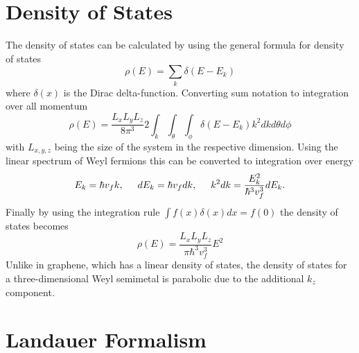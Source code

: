\documentclass[prb,twocolumn,aps,superscriptaddress,showpacs,floatfix]{revtex4}
\begin{document}

\section{Density of States}
			The density of states can be calculated by using the general formula for density of states \cite{bb3}
			\begin{equation}
				\rho\left(E\right)=\sum_{k}\delta\left(E-E_{k}\right)
			\end{equation}
			where $\delta\left(x\right)$ is the Dirac delta-function. Converting sum notation to integration over all momentum
			\begin{equation}
				\rho\left(E\right)=\frac{L_{x}L_{y}L_{z}}{8\pi^{3}}2\int_{k}\int_{\theta}\int_{\phi}\delta\left(E-E_{k}\right)k^{2}dkd\theta d\phi
			\end{equation}
			with $L_{x,y,z}$ being the size of the system in the respective dimension. Using the linear spectrum of Weyl fermions this can be converted to integration over energy
			\begin{equation}
				E_{k}=\hbar v_{f}k,
				\hspace{0.5cm}
				dE_{k}=\hbar v_{f}dk,
				\hspace{0.5cm}
				k^{2}dk=\frac{E_{k}^{2}}{\hbar^{3}v_{f}^{3}}dE_{k}.
			\end{equation}
			Finally by using the integration rule $\int f(x)\delta(x) dx=f(0)$ the density of states becomes
			\begin{equation}
				\rho\left(E\right)=\frac{L_{x}L_{y}L_{z}}{\pi\hbar^{3}v_{f}^{3}}E^{2}
				\label{weyl-dos}
			\end{equation}
			Unlike in graphene, which has a linear density of states, the density of states for a three-dimensional Weyl semimetal is parabolic due to the additional $k_{z}$ component.


\section{Landauer Formalism}
\end{document}
